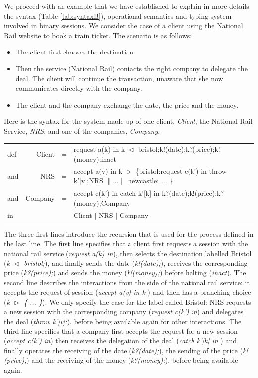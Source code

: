 \documentclass[a4paper,11pt,twoside]{report}
\begin{document}
We proceed with an example that we have established to explain in more details the syntax (Table \ref{tab:syntaxB}), operational semantics and typing system involved in binary sessions.
We consider the case of a client using the National Rail website to book a train ticket. The scenario is as follows:
\begin{itemize}
\item The client first chooses the destination.
\item Then the service (National Rail) contacts the right company to delegate the deal. The client will continue the transaction, unaware that she now communicates directly with the company.
\item The client and the company exchange the date, the price and the money.
\end{itemize}
Here is the syntax for the system made up of one client, {\em Client}, the National Rail Service, {\em NRS}, and one of the companies, {\em Company}.
\begin{center}
\begin{tabular}{lrcl}
def&Client &=& request a(k) in  k $\vartriangleleft$ bristol;k!(date);k?(price);k!(money);inact\\
and&NRS &=& accept a(v) in k $\vartriangleright$ \{bristol:request c(k') in throw k'[v];NRS $\| ...\|$ newcastle: ... \}\\
and&Company &=& accept c(k') in catch k'[k] in k?(date);k!(price);k?(money);Company\\
in& & &Client | NRS | Company\\
\end{tabular}
\end{center}
The three first lines introduce the recursion that is used for the process defined in the last line. The first line specifies that a client first requests a session with the national rail service (\emph{request a(k) in}), then selects the destination labelled Bristol (\emph{k $\vartriangleleft$ bristol;}), and finally sends the date (\emph{k!(date);}), receives the corresponding price (\emph{k?(price);}) and sends the money (\emph{k!(money);}) before halting (\emph{inact}). The second line describes  the interactions from the side of the national rail service: it accepts the request of session (\emph{accept a(v) in k }) and then has a branching choice (\emph{k $\vartriangleright$ \{ ... \}}). We only specify the case for the label called Bristol: NRS requests a new session with the corresponding company (\emph{request c(k') in}) and delegates the deal (\emph{throw k'[v];}), before being available again for other interactions. The third line specifies that a company first accepts the request for a new session (\emph{accept c(k') in}) then receives the delegation of the deal (\emph{catch k'[k] in }) and finally operates the receiving of the date (\emph{k?(date);}), the sending of the price (\emph{k!(price);}) and the receiving of the money (\emph{k?(money);}), before being available again.
\end{document}
